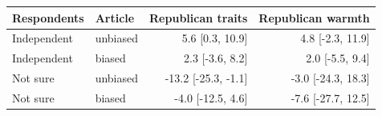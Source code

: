\begin{tabular}{llrr}
\toprule
Respondents & Article & Republican traits & Republican warmth \\
\midrule
Independent & unbiased & 5.6 [0.3, 10.9] & 4.8 [-2.3, 11.9] \\
Independent & biased & 2.3 [-3.6, 8.2] & 2.0 [-5.5, 9.4] \\
Not sure & unbiased & -13.2 [-25.3, -1.1] & -3.0 [-24.3, 18.3] \\
Not sure & biased & -4.0 [-12.5, 4.6] & -7.6 [-27.7, 12.5] \\
\bottomrule
\end{tabular}
